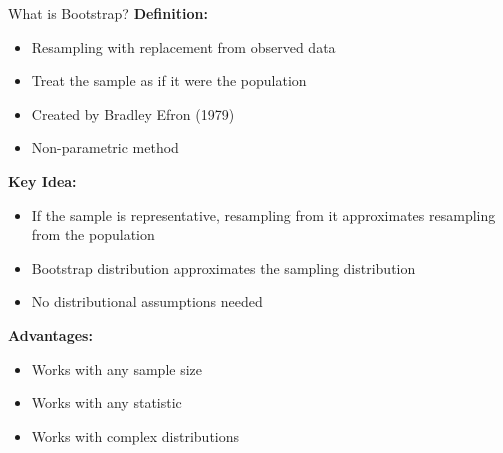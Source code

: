 \documentclass[aspectratio=169]{beamer}
\begin{document}
\begin{frame}{What is Bootstrap?}
\footnotesize
\textbf{Definition:}
\begin{itemize}
    \item Resampling with replacement from observed data
    \item Treat the sample as if it were the population
    \item Created by Bradley Efron (1979)
    \item Non-parametric method
\end{itemize}

\vspace{0.2cm}
\textbf{Key Idea:}
\begin{itemize}
    \item If the sample is representative, resampling from it approximates resampling from the population
    \item Bootstrap distribution approximates the sampling distribution
    \item No distributional assumptions needed
\end{itemize}

\vspace{0.15cm}
\textbf{Advantages:}
\begin{itemize}
    \item Works with any sample size
    \item Works with any statistic
    \item Works with complex distributions
\end{itemize}
\end{frame}
\end{document}
